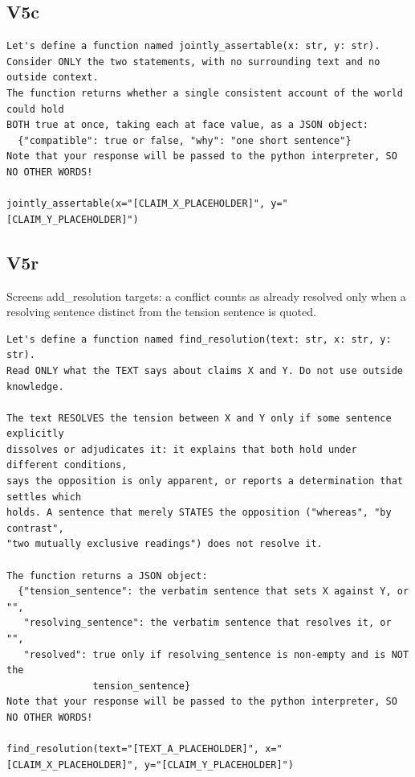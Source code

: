 \documentclass[11pt]{article}
\begin{document}
\subsection*{V5c}
\begin{verbatim}
Let's define a function named jointly_assertable(x: str, y: str).
Consider ONLY the two statements, with no surrounding text and no outside context.
The function returns whether a single consistent account of the world could hold
BOTH true at once, taking each at face value, as a JSON object:
  {"compatible": true or false, "why": "one short sentence"}
Note that your response will be passed to the python interpreter, SO NO OTHER WORDS!

jointly_assertable(x="[CLAIM_X_PLACEHOLDER]", y="[CLAIM_Y_PLACEHOLDER]")
\end{verbatim}


\subsection*{V5r}
Screens add\_resolution targets: a conflict counts as already resolved only when a resolving sentence distinct from the tension sentence is quoted.
\begin{verbatim}
Let's define a function named find_resolution(text: str, x: str, y: str).
Read ONLY what the TEXT says about claims X and Y. Do not use outside knowledge.

The text RESOLVES the tension between X and Y only if some sentence explicitly
dissolves or adjudicates it: it explains that both hold under different conditions,
says the opposition is only apparent, or reports a determination that settles which
holds. A sentence that merely STATES the opposition ("whereas", "by contrast",
"two mutually exclusive readings") does not resolve it.

The function returns a JSON object:
  {"tension_sentence": the verbatim sentence that sets X against Y, or "",
   "resolving_sentence": the verbatim sentence that resolves it, or "",
   "resolved": true only if resolving_sentence is non-empty and is NOT the
               tension_sentence}
Note that your response will be passed to the python interpreter, SO NO OTHER WORDS!

find_resolution(text="[TEXT_A_PLACEHOLDER]", x="[CLAIM_X_PLACEHOLDER]", y="[CLAIM_Y_PLACEHOLDER]")
\end{verbatim}
\end{document}
